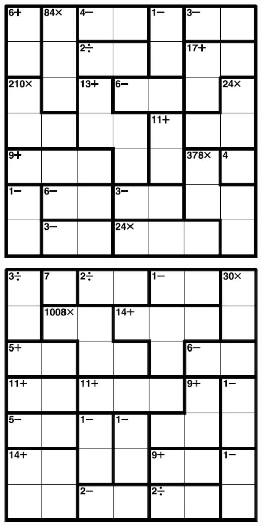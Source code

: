
\includegraphics[scale=1]{Gambar/Lampiran/7x7_9.png}

\includegraphics[scale=1]{Gambar/Lampiran/7x7_10.png}
